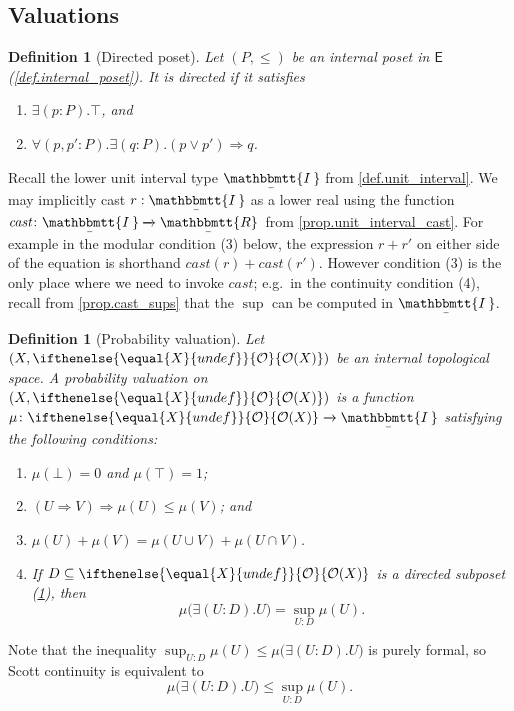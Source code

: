 \documentclass[reqno,11pt]{amsproc}
\theoremstyle{plain}
\newtheorem{definition}[theorem]{Definition}
\theoremstyle{definition}
\newcommand{\cat}[1]{\mathsf{#1}}
\renewcommand{\to}[1][]{\xrightarrow{#1}}
\newcommand{\ubar}[1]{\underaccent{\bar}{#1}}
\newcommand{\internal}[1]{\raisebox{-.03ex}{$\mathbbmtt{#1}$}}
\newcommand{\hs}{\hspace{1pt}}
\newcommand{\trr}{\internal{R}}
\newcommand{\tii}{\ubar{\internal{I\hs\hs}}\!\hs}
\newcommand{\tlrr}{\ubar{\trr}\hs}
\newcommand{\cast}{\textit{cast}}
\newcommand{\Op}[1][undef]{\ifthenelse{\equal{#1}{undef}}{\mathcal{O}}{\mathcal{O}(#1)}}
\newcommand{\imp}{\Rightarrow}
\numberwithin{equation}{section}
\begin{document}
\subsection{Valuations}\label{sec.valuations}

\begin{definition}[Directed poset]\label{def.directed}
Let $(P,\leq)$ be an internal poset in $\cat{E}$ (\cref{def.internal_poset}). It is \emph{directed} if it satisfies
\begin{enumerate}
	\item $\exists(p:P).\top$, and
	\item $\forall(p,p':P).\exists(q:P).(p\vee p')\imp q$.
\end{enumerate}
\end{definition}


Recall the lower unit interval type $\tii$ from \cref{def.unit_interval}. We may implicitly cast $r:\tii$ as a lower real using the function $\cast\colon\tii\to\tlrr$ from \cref{prop.unit_interval_cast}. For example in the modular condition (3) below, the expression $r+r'$ on either side of the equation is shorthand $\cast(r)+\cast(r')$. However condition (3) is the only place where we need to invoke $\cast$; e.g.\ in the continuity condition (4), recall from \cref{prop.cast_sups} that the $\sup$ can be computed in $\tii$.

\begin{definition}[Probability valuation]\label{def.prob_valuation}
Let $(X,\Op[X])$ be an internal topological space. A \emph{probability valuation} on $(X,\Op[X])$ is a function $\mu\colon\Op[X]\to\tii$ satisfying the following conditions:
\begin{enumerate}
	\item $\mu(\bot)=0$ and $\mu(\top)=1$;
	\item $(U\imp V)\imp\mu(U)\leq\mu(V)$; and
	\item $\mu(U)+\mu(V)=\mu(U\cup V)+\mu(U\cap V)$.
	\item If $D\subseteq\Op[X]$ is a directed subposet (\cref{def.directed}), then
\[
	\mu\big(\exists(U:D).U\big)= \sup_{U: D}\mu(U).
\]
\end{enumerate}
\end{definition}
Note that the inequality $\sup_{U: D}\mu(U)\leq\mu\big(\exists(U:D).U\big)$ is purely formal, so Scott continuity is equivalent to
\begin{equation}\label{eqn.scott_continuity}
	\mu\big(\exists(U:D).U\big)\leq\sup_{U: D}\mu(U).
\end{equation}
\end{document}
